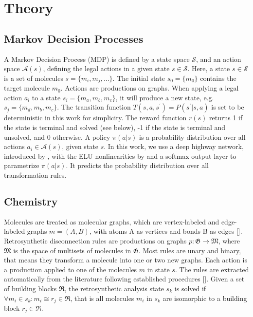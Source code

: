 \documentclass{article} %
\begin{document}
\section{Theory}

\subsection{Markov Decision Processes}


A Markov Decision Process (MDP) is defined by a state space $\mathcal{S}$, and an action space $\mathcal{A}(s)$, defining the legal actions in a given state $s \in \mathcal{S}$. Here, a state $s \in \mathcal{S}$ is a set of molecules $s=\{m_i,m_j,...\}$. The initial state $s_0 = \{m_0\}$ contains the target molecule $m_0$. Actions are productions on graphs. When applying a legal action $a_l$ to a state $s_i = \{m_a,m_b,m_c\}$, it will produce a new state, e.g. $s_j = \{m_d,m_b,m_c\}$. The transition function $T(s,a,s^\prime)=P(s^\prime | s,a)$ is set to be deterministic in this work for simplicity. The reward function $r(s)$ returns 1 if the state is terminal and solved (see below), -1 if the state is terminal and unsolved, and 0 otherwise. 
A policy $\pi(a|s)$ is a probability distribution over all actions $a_i \in \mathcal{A}(s)$, given state $s$. In this work, we use a deep highway network, introduced by \cite{srivastava2015training}, with the ELU nonlinearities by \cite{clevert2015fast} and a softmax output layer to parametrize $\pi(a|s)$. It predicts the probability distribution over all transformation rules. 


\subsection{Chemistry}

Molecules are treated as molecular graphs, which are vertex-labeled and edge-labeled graphs $m=(A,B)$, with atoms A as vertices and bonds B as edges [\cite{andersen2014generic}]. Retrosynthetic disconnection rules are productions on graphs $p:\mathfrak{G} \rightarrow \mathfrak{M}$, where $\mathfrak{M}$ is the space of multisets of molecules in $\mathfrak{G}$. Most rules are unary and binary, that means they transform a molecule into one or two new graphs. Each action is a production applied to one of the molecules $m$ in state $s$. The rules are extracted automatically from the literature following established procedures [\cite{segler2017modelling}].
Given a set of building blocks $\mathfrak{R}$, the retrosynthetic analysis state $s_k$ is solved if $\forall m_i \in s_k: m_i \cong r_j \in \mathfrak{R}$, that is all molecules $m_i$ in $s_k$ are isomorphic to a building block $r_j \in \mathfrak{R}$.
\end{document}
